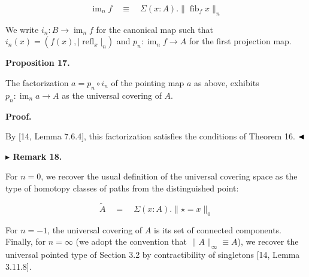 \documentclass[10pt,a4paper]{article}
\begin{document}
\par  \quad  \[\operatorname{im}_{n}f\quad\equiv\quad\Sigma(x:A).\|\operatorname{fib}_{f}x\|_{n}\]\quad  \quad  
  
We write $i_{n}:B\to\operatorname{im}_{n}f$ for the canonical map such that $i_{n}(x)=(f(x),|\operatorname{refl}_{x}|_{n})$ and $p_{n}:\operatorname{im}_{n}f\to A$ for the first projection map.\par
 
 
 
\par\medskip\noindent\textbf{Proposition 17.}\par
 
 
The factorization $a=p_{n}\circ i_{n}$ of the pointing map $a$ as above, exhibits $p_{n}:\operatorname{im}_{n}a\to A$ as the universal covering of $A$.\par
 
 
 
 
 
\par\medskip\noindent\textbf{Proof.}\par
 
 
By [14, Lemma 7.6.4], this factorization satisfies the conditions of Theorem 16. $\hfill\blacktriangleleft$\par
 
 
 
\par\medskip\noindent\textbf{$\blacktriangleright$ Remark 18.}\par
 
 
For $n=0$, we recover the usual definition of the universal covering space as the type of homotopy classes of paths from the distinguished point:\par
  
\par  \quad  \[\tilde{A}\quad=\quad\Sigma(x:A).\|\star=x\|_{0}\]\quad  \quad  
  
For $n=-1$, the universal covering of $A$ is its set of connected components. Finally, for $n=\infty$ (we adopt the convention that $\|A\|_{\infty}\equiv A$), we recover the universal pointed type of Section 3.2 by contractibility of singletons [14, Lemma 3.11.8].\par
 
\end{document}
